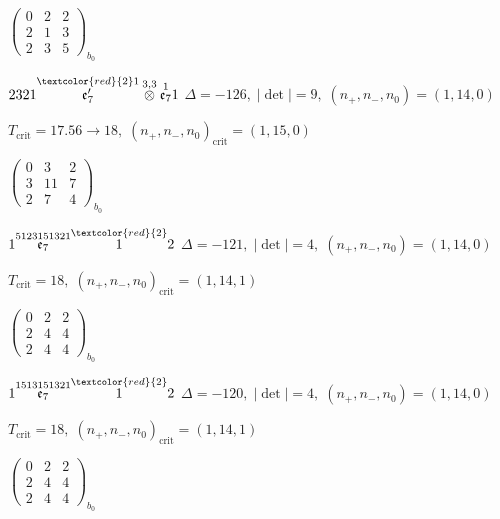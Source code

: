 \documentclass[10pt]{article}
\begin{document}
\hspace{2em}$\left(\begin{smallmatrix}0 & 2 & 2 \\ 2 & 1 & 3 \\ 2 & 3 & 5\end{smallmatrix}\right)_{\!b_0}$

\smallskip

$2321\overset{\textcolor{red}{2}1}{\mathfrak{e}_7'}\overset{3,3}{\otimes}\overset{1}{\mathfrak{e}_7}1$ \quad $\Delta=-126,\; |\det|=9,\; (n_+,n_-,n_0)=(1,14,0)$

\hspace{1em}$T_{\text{crit}}=17.56 \to 18,\; (n_+,n_-,n_0)_{\text{crit}}=(1,15,0)$

\hspace{2em}$\left(\begin{smallmatrix}0 & 3 & 2 \\ 3 & 11 & 7 \\ 2 & 7 & 4\end{smallmatrix}\right)_{\!b_0}$

\smallskip

$1\overset{5123151321}{\mathfrak{e}_7}\overset{\textcolor{red}{2}}{1}2$ \quad $\Delta=-121,\; |\det|=4,\; (n_+,n_-,n_0)=(1,14,0)$

\hspace{1em}$T_{\text{crit}}=18,\; (n_+,n_-,n_0)_{\text{crit}}=(1,14,1)$

\hspace{2em}$\left(\begin{smallmatrix}0 & 2 & 2 \\ 2 & 4 & 4 \\ 2 & 4 & 4\end{smallmatrix}\right)_{\!b_0}$

\smallskip

$1\overset{1513151321}{\mathfrak{e}_7}\overset{\textcolor{red}{2}}{1}2$ \quad $\Delta=-120,\; |\det|=4,\; (n_+,n_-,n_0)=(1,14,0)$

\hspace{1em}$T_{\text{crit}}=18,\; (n_+,n_-,n_0)_{\text{crit}}=(1,14,1)$

\hspace{2em}$\left(\begin{smallmatrix}0 & 2 & 2 \\ 2 & 4 & 4 \\ 2 & 4 & 4\end{smallmatrix}\right)_{\!b_0}$
\end{document}
